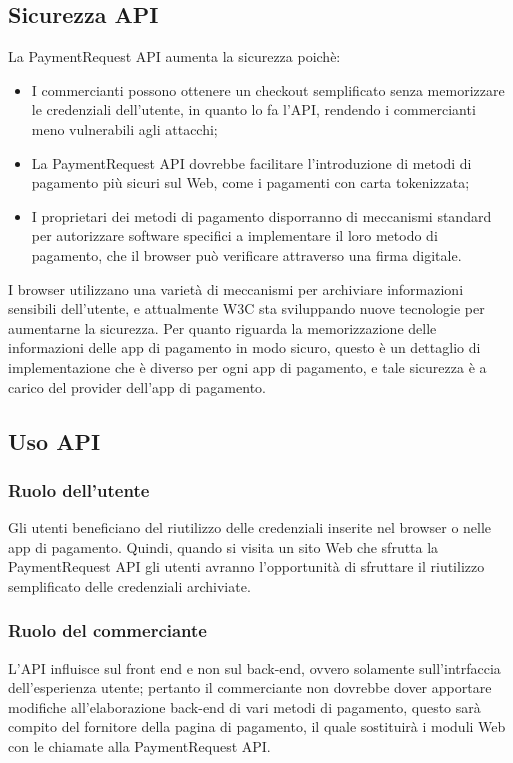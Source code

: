 \documentclass[italian]{article}
\begin{document}
	\subsection{Sicurezza API}
	La PaymentRequest API aumenta la sicurezza poichè:
	\begin{itemize}
	\item I commercianti possono ottenere un checkout semplificato senza memorizzare le credenziali dell'utente, in quanto lo fa l'API, rendendo i commercianti meno vulnerabili agli attacchi;
	\item La PaymentRequest API dovrebbe facilitare l'introduzione di metodi di pagamento più sicuri sul Web, come i pagamenti con carta tokenizzata;
	\item I proprietari dei metodi di pagamento disporranno di meccanismi standard per autorizzare software specifici a implementare il loro metodo di pagamento, che il browser può verificare attraverso una firma digitale.
	\end{itemize}
	I browser utilizzano una varietà di meccanismi per archiviare informazioni sensibili dell'utente, e attualmente W3C sta sviluppando nuove tecnologie per aumentarne la sicurezza.
	Per quanto riguarda la memorizzazione delle informazioni delle app di pagamento in modo sicuro, questo è un dettaglio di implementazione che è diverso per ogni app di pagamento, e tale sicurezza è a carico del provider dell'app di pagamento.
	
	\subsection{Uso API}
	\subsubsection{Ruolo dell'utente}
	Gli utenti beneficiano del riutilizzo delle credenziali inserite nel browser o nelle app di pagamento. Quindi, quando si visita un sito Web che sfrutta la PaymentRequest API gli utenti avranno l'opportunità di sfruttare il riutilizzo semplificato delle credenziali archiviate.

	\subsubsection{Ruolo del commerciante}
	L'API influisce sul front end e non sul back-end, ovvero solamente sull'intrfaccia dell'esperienza utente; pertanto il commerciante non dovrebbe dover apportare modifiche all'elaborazione back-end di vari metodi di pagamento, questo sarà compito del fornitore della pagina di pagamento, il quale sostituirà i moduli Web con le chiamate alla PaymentRequest API.
	
\end{document}
